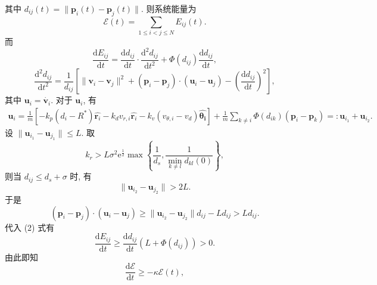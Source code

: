 \documentclass{article}
\theoremstyle{definition} %
\begin{document}
其中 $d_{ij}(t)=\|\boldsymbol{p}_i(t)-\boldsymbol{p}_j(t)\|.$ 则系统能量为
\begin{equation*}
    \mathcal{E}(t)=\sum_{1\leqslant i<j\leqslant N}E_{ij}(t).
\end{equation*}
而
\begin{equation*}
    \frac{\mathrm{d}E_{ij}}{\mathrm{d}t}=\frac{\mathrm{d}d_{ij}}{\mathrm{d}t}\cdot\frac{\mathrm{d}^2d_{ij}}{\mathrm{d}t^2}+\mathit{\Phi}(d_{ij})\frac{\mathrm{d}d_{ij}}{\mathrm{d}t},
\end{equation*}
\begin{equation}
    \frac{\mathrm{d}^2d_{ij}}{\mathrm{d}t^2}=\frac{1}{d_{ij}}\left[\|\boldsymbol{v}_i-\boldsymbol{v}_j\|^2+(\boldsymbol{p}_i-\boldsymbol{p}_j)\cdot(\boldsymbol{u}_i-\boldsymbol{u}_j)-\left(\frac{\mathrm{d}d_{ij}}{\mathrm{d}t}\right)^2\right],
\end{equation}
其中 $\boldsymbol{u}_i=\dot{\boldsymbol{v}_i}.$ 对于 $\boldsymbol{u}_i$, 有
\begin{align*}
    \boldsymbol{u}_i=\frac{1}{m}[-k_p(d_i-R^*)\widehat{\boldsymbol{r}_i}-k_dv_{r,i}\widehat{\boldsymbol{r}_i}-k_v(v_{\theta,i}-v_d)\hat{\boldsymbol{\theta_i}}]+\frac{1}{m}\sum_{k\ne i}\mathit{\Phi}(d_{ik})(\boldsymbol{p}_i-\boldsymbol{p}_k)=:\boldsymbol{u}_{i_1}+\boldsymbol{u}_{i_2}.
\end{align*}
设 $\|\boldsymbol{u}_{i_1}-\boldsymbol{u}_{j_1}\|\leqslant L.$ 取
\begin{equation*}
    k_r>L\sigma^2\mathrm{e}^{\frac{1}{2}}\max\left\{\frac{1}{d_s},\frac{1}{\displaystyle\min_{k\ne l}d_{kl}(0)}\right\},
\end{equation*}
则当 $d_{ij}\leqslant d_s+\sigma$ 时, 有
\begin{equation*}
    \|\boldsymbol{u}_{i_2}-\boldsymbol{u}_{j_2}\|>2L.
\end{equation*}
于是
\begin{equation*}
    (\boldsymbol{p}_i-\boldsymbol{p}_j)\cdot(\boldsymbol{u}_i-\boldsymbol{u}_j)\geqslant\|\boldsymbol{u}_{i_2}-\boldsymbol{u}_{j_2}\|d_{ij}-Ld_{ij}>Ld_{ij}.
\end{equation*}
代入 (2) 式有
\begin{equation*}
    \frac{\mathrm{d}E_{ij}}{\mathrm{d}t}\geqslant\frac{\mathrm{d}d_{ij}}{\mathrm{d}t}(L+\mathit{\Phi}(d_{ij}))>0.
\end{equation*}
由此即知
\begin{equation*}
    \frac{\mathrm{d}\mathcal{E}}{\mathrm{d}t}\geqslant-\kappa\mathcal{E}(t),
\end{equation*}
\end{document}
